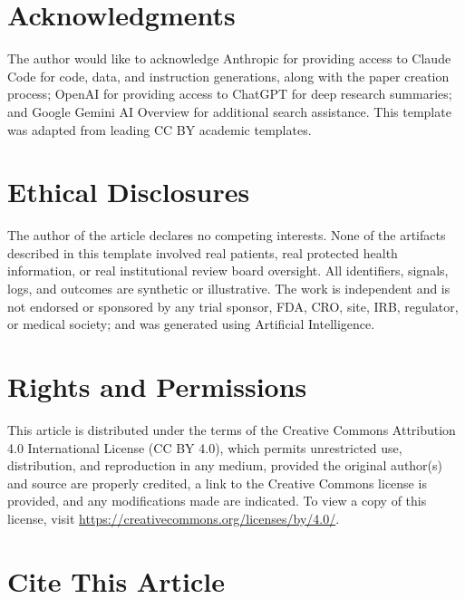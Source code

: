 
{}
\section*{Acknowledgments}
\label{sec:acknowledgments}

The author would like to acknowledge Anthropic for providing access to Claude
Code for code, data, and instruction generations, along with the paper
creation process; OpenAI for providing access to ChatGPT for deep research
summaries; and Google Gemini AI Overview for additional search assistance.
This template was adapted from leading CC BY academic templates.

{}
\section*{Ethical Disclosures}
\label{sec:ethics}

The author of the article declares no competing interests. None of the
artifacts described in this template involved real patients, real protected
health information, or real institutional review board oversight. All
identifiers, signals, logs, and outcomes are synthetic or illustrative. The
work is independent and is not endorsed or sponsored by any trial sponsor,
FDA, CRO, site, IRB, regulator, or medical society; and was generated using
Artificial Intelligence.

{}
\section*{Rights and Permissions}
\label{sec:rights}

This article is distributed under the terms of the Creative Commons
Attribution 4.0 International License (CC BY 4.0), which permits unrestricted
use, distribution, and reproduction in any medium, provided the original
author(s) and source are properly credited, a link to the Creative Commons
license is provided, and any modifications made are indicated. To view a
copy of this license, visit \url{https://creativecommons.org/licenses/by/4.0/}.

{}
\section*{Cite This Article}
\label{sec:cite}

